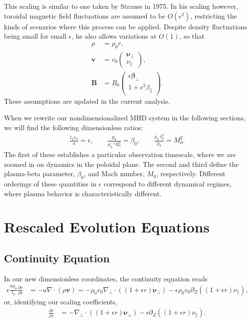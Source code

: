 \documentclass{article}
\newcommand{\para}{\parallel}
\newcommand{\ep}{\epsilon}
\newcommand{\np}{\nabla_\perp}
\newcommand{\p}{\partial}
\newcommand{\deriv}[2]{\frac{\p #1}{\p #2}}
\newcommand{\pth} [1] {\left( #1 \right) }
\newcommand{\pmat} [1] {\begin{pmatrix} #1 \end{pmatrix}}
\begin{document}
This scaling is similar to one taken by Strauss in 1975. In his scaling however, toroidal magnetic field fluctuations are assumed to be $O\pth{\ep^2}$, restricting the kinds of scenarios where this process can be applied. Despite density fluctuations being small for small $\ep$, he also allows variations at $O(1)$, so that 
\begin{align*}
    \rho &= \rho_0 r, \\
    \bm{v} &= v_0 \pmat{\bm{\nu}_\perp \\ \nu_\para}, \\ 
    \bm{B} &= B_0 \pmat{\ep\bm{\beta}_\perp \\ 1+\ep^2\beta_\para}.
\end{align*}
These assumptions are updated in the current analysis. 

When we rewrite our nondimensionalized MHD system in the following sections, we will find the following dimensionless ratios:  
\begin{align*}
    \frac{t_0 v_0}{a} = \ep, \qquad 
    \frac{p_0}{\mu_0^{-1}B_0^2} = \beta_0, \qquad 
    \frac{\rho_0\,v_0^2}{p_0} = M_0^2. 
\end{align*}
The first of these establishes a particular observation timescale, where we are zoomed in on dynamics in the poloidal plane. The second and third define the plasma-beta parameter, $\beta_0$, and Mach number, $M_0$, respectively. Different orderings of these quantities in $\ep$ correspond to different dynamical regimes, where plasma behavior is characteristically different. 


\section{Rescaled Evolution Equations}
\subsection{Continuity Equation}
In our new dimensionless coordinates, the continuity equation reads
\begin{align*}
    \ep\frac{a\rho_0}{t_0}\deriv{r}{\tau} &= -a\nabla\cdot\pth{\rho\bm{v}} = -\rho_0v_0\np\cdot\pth{\pth{1+\ep r}\bm{\nu}_\perp} - \ep\rho_0v_0 \p_Z\pth{\pth{1+\ep r}\nu_\para}, 
\end{align*}
or, identifying our scaling coefficients, 
\begin{align} 
    \deriv{r}{\tau} &= -\np\cdot\pth{\pth{1+\ep r}\bm{\nu}_\perp} - \ep\p_Z\pth{\pth{1+\ep r}\nu_\para}. 
\end{align}
\end{document}
